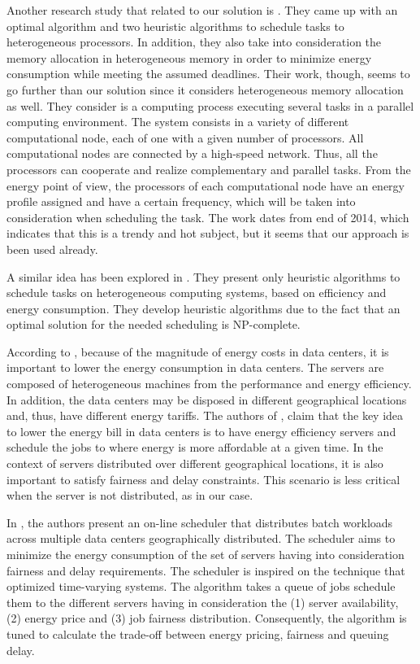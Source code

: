 Another research study that related to our solution is \cite{TASK_SCHED}. They
came up with an optimal algorithm and two heuristic algorithms to schedule tasks
to heterogeneous processors. In addition, they also take into consideration the 
memory allocation in heterogeneous memory in order
to minimize energy consumption while meeting the assumed deadlines. Their work,
though, seems to go further than our solution since it considers heterogeneous
memory allocation as well. They consider is a
computing process executing several tasks in a parallel computing environment. The
system consists in a variety of different computational node, each of one with a
given number of processors. All computational nodes are connected by a
high-speed network. Thus, all  the processors can cooperate and realize complementary
and parallel tasks. From the energy point of view, the processors of each 
computational node have an energy profile assigned and have a certain frequency, 
which will be taken into consideration when scheduling the task. The work dates 
from end of 2014, which indicates that this is a trendy and hot subject, but it 
seems that our approach is been used already. 

A similar idea has been explored in \cite{EXE_METHOD}. They present only
heuristic algorithms to schedule tasks on heterogeneous computing systems,
based on efficiency and energy consumption. They develop heuristic algorithms
due to the fact that an optimal solution for the needed scheduling is
NP-complete.  


According to \cite{EFF_JOB_SCHEDULING}, because of the magnitude of energy costs in data centers, it is important to
lower the energy consumption in data centers. The servers are composed of
heterogeneous machines from the performance and energy efficiency. In addition,
the data centers may be disposed in different geographical locations and, thus,
have different energy tariffs. The authors of \cite{EFF_JOB_SCHEDULING}, claim that
the key idea to lower the energy bill in data centers is to have energy
efficiency servers and schedule the jobs to where energy is more affordable at a
given time. In the context of servers distributed over different geographical locations, it
is also important to satisfy fairness and delay constraints. This scenario is
less critical when the server is not distributed, as in our case.

In \cite{EFF_JOB_SCHEDULING}, the authors present an on-line scheduler that
distributes batch workloads across multiple data centers geographically
distributed. The scheduler aims to minimize the energy consumption of the set of
servers having into consideration fairness and delay requirements.  The scheduler is inspired on the technique that
optimized time-varying systems. The algorithm takes a queue of jobs schedule them to the different servers
having in consideration the (1) server availability, (2) energy price and (3)
job fairness distribution. Consequently, the algorithm is tuned to calculate the
trade-off between energy pricing, fairness and queuing delay.

